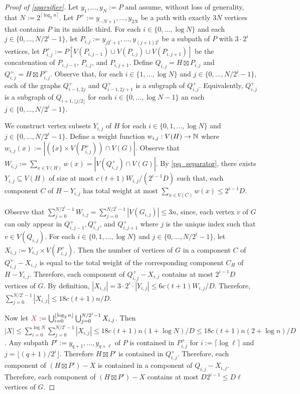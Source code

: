 \documentclass{patmorin}
\makeatletter
\renewcommand{\le}{\leqslant}
\def\mathcolor#1#{\@mathcolor{#1}}
\def\@mathcolor#1#2#3{%
  \protect\leavevmode
  \begingroup
    \color#1{#2}#3%
  \endgroup
}
\newcommand{\mathdefin}[1]{\mathcolor{brightmaroon}{#1}}
\makeatother
\begin{document}
\begin{proof}[Proof of \cref{sparsifier}]
  Let $y_1,\ldots,y_N:= P$ and assume, without loss of generality, that  $N:=2^{\lceil\log_2 n\rceil}$.
  Let $P^+:=y_{-N+1},\ldots,y_{2N}$ be a path with exactly $3N$ vertices that contains $P$ in its middle third.
  For each $i\in\{0,\ldots,\log N\}$ and each $j\in\{0,\ldots,N/2^{i}-1\}$, let $P_{i,j}:=y_{j2^i+1},\ldots,y_{(j+1)2^i}$ be a subpath of $P$ with $3\cdot2^i$ vertices,
  let $P^+_{i,j}:=P[V(P_{i,j-1})\cup V(P_{i,j})\cup V(P_{i,j+1})]$ be the concatenation of $P_{i,j-1}$, $P_{i,j}$, and $P_{i,j+1}$.
  Define $Q_{i,j}=H\boxtimes P_{i,j}$ and $Q^+_{i,j}=H\boxtimes P^+_{i,j}$.
  Observe that, for each $i\in\{1,\ldots,\log N\}$ and $j\in\{0,\ldots,N/2^i-1\}$, each of the graphs $Q^+_{i-1,2j}$ and $Q^+_{i-1,2j+1}$ is a subgraph of $Q^+_{i,j}$.
  Equivalently, $Q^+_{i,j}$ is a subgraph of $Q_{i+1,\lfloor j/2\rfloor}$ for each $i\in\{0,\ldots,\log N-1\}$ an each $j\in\{0,\ldots,N/2^i-1\}$.

  We construct vertex subsets $Y_{i,j}$ of $H$ for each $i\in\{0,1,\ldots,\log N\}$ and $j\in\{0,\ldots,N/2^{i}-1\}$.  Define a weight function $w_{i,j}:V(H)\to\mathbb{N}$ where $w_{i,j}(x):=|(\{x\}\times V(P^+_{i,j})) \cap V(G)|$.  Observe that $W_{i,j}:=\sum_{x\in V(H)} w(x)=|V(Q^+_{i,j})\cap V(G)|$. By \cref{pq_separator}, there exists $Y_{i,j}\subseteq V(H)$ of size at most $c(t+1)W_{i,j}/(2^{i-1}D)$ such that, each component $C$ of $H-Y_{i,j}$ has total weight at most $\sum_{x\in V(C)} w(x) \le 2^{i-1}D$.

  Observe that $\sum_{j=0}^{N/2^i-1} W_{i,j}=\sum_{j=0}^{N/2^i-1} |V(G_{i,j})| \le 3n$, since, each vertex $v$ of $G$ can only appear in $Q^+_{i,j-1}, Q^+_{i,j}$, and $Q^+_{i,j+1}$ where $j$ is the unique index such that $v\in V(Q_{i,j})$.  For each $i\in\{0,1,\ldots,\log N\}$ and $j\in\{0,\ldots,N/2^{i}-1\}$, let $X_{i,j}:=Y_{i,j}\times V(P^+_{i,j})$.  Then the number of vertices of $G$ in a component $C$ of $Q^+_{i,j}-X_{i,j}$ is equal to the total weight of the corresponding component $C_H$ of $H-Y_{i,j}$.  Therefore, each component of $Q^+_{i,j}-X_{i,j}$ contains at most $2^{i-1}D$ vertices of $G$.  By definition, $|X_{i,j}|=3\cdot 2^i \cdot |Y_{i,j}| \le 6c(t+1)W_{i,j}/D$.  Therefore, $\sum_{j=0}^{N/2^i-1} |X_{i,j}|\le 18c(t+1)n/D$.

  Now let $\mathdefin{X}:=\bigcup_{i=0}^{\lfloor\log_2 n\rfloor}\bigcup_{j=0}^{N/2^i-1} X_{i,j}$.  Then $|X|\le\sum_{i=0}^{\log N}\sum_{j=0}^{N/2^i-1} |X_{i,j}|\le 18c(t+1)n(1+\log N)/D\le 18c(t+1)n(2+\log n)/D$. Any subpath $P':=y_{q+1},\ldots,y_{q+\ell}$ of $P$ is contained in $P^+_{i,j}$ for $i:=\lceil\log \ell\rceil$ and $j=\lfloor(q+1)/2^i\rfloor$.  Therefore $H\boxtimes P'$ is contained in $Q^+_{i,j}$.  Therefore, each component of $(H\boxtimes P')-X$ is contained in a component of $Q_{i,j}-X_{i,j}$.  Therefore, each component of $(H\boxtimes P')-X$ contains at most $D2^{i-1}\le D\ell$ vertices of $G$.
\end{proof}
\end{document}
